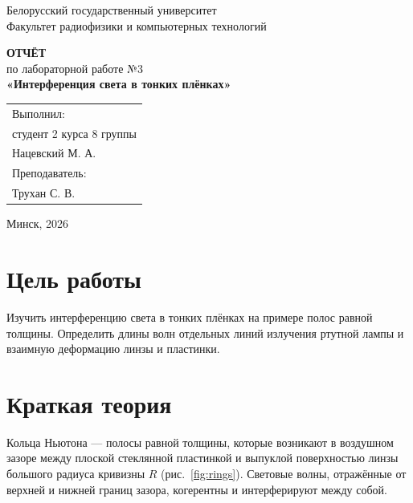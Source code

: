 \documentclass[14pt,a4paper]{extarticle}
\begin{document}
\begin{titlepage}
\begin{center}
\onehalfspacing
Белорусский государственный университет\\
Факультет радиофизики и компьютерных технологий

\vspace{4cm}

\textbf{ОТЧЁТ}\\
по лабораторной работе №3\\[0.3cm]
\textbf{«Интерференция света в тонких плёнках»}

\vspace{4cm}

\begin{flushright}
\begin{tabular}{@{}p{7.5cm}@{}}
\raggedright
Выполнил:\\
студент 2 курса 8 группы\\
Нацевский М. А.\\
Преподаватель:\\
Трухан С. В.\\
\end{tabular}
\end{flushright}

\vfill
Минск, 2026
\end{center}
\end{titlepage}
\setcounter{page}{2}

\section*{Цель работы}

Изучить интерференцию света в тонких плёнках на примере полос равной толщины. Определить длины волн отдельных линий излучения ртутной лампы и взаимную деформацию линзы и пластинки.

\section*{Краткая теория}

Кольца Ньютона --- полосы равной толщины, которые возникают в воздушном зазоре между плоской стеклянной пластинкой и выпуклой поверхностью линзы большого радиуса кривизны $R$ (рис.~\ref{fig:rings}). Световые волны, отражённые от верхней и нижней границ зазора, когерентны и интерферируют между собой.
\end{document}
